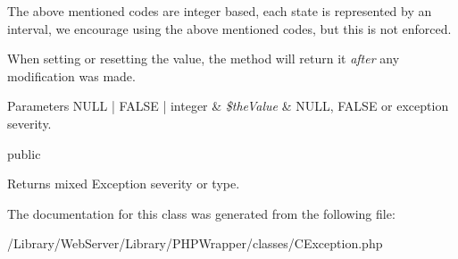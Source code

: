 The above mentioned codes are integer based, each state is represented by an interval, we encourage using the above mentioned codes, but this is not enforced.

When setting or resetting the value, the method will return it {\itshape after} any modification was made.


\begin{DoxyParams}[1]{Parameters}
N\-U\-L\-L | F\-A\-L\-S\-E | integer & {\em \$the\-Value} & N\-U\-L\-L, F\-A\-L\-S\-E or exception severity.\\
\hline
\end{DoxyParams}
public \begin{DoxyReturn}{Returns}
mixed Exception severity or type. 
\end{DoxyReturn}


The documentation for this class was generated from the following file\-:\begin{DoxyCompactItemize}
\item 
/\-Library/\-Web\-Server/\-Library/\-P\-H\-P\-Wrapper/classes/C\-Exception.\-php\end{DoxyCompactItemize}
